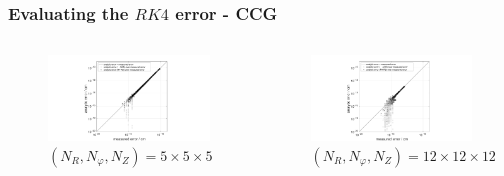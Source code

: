 \documentclass{beamer}
\begin{document}
\begin{frame}
\frametitle{Evaluating the $RK4$ error - CCG}
\vspace{-1.5cm}
\begin{columns}[onlytextwidth]
	\begin{column}{0.5\textwidth}
		\begin{center}
			\begin{figure}
				\includegraphics[trim={9cm 0cm 10cm 0cm},clip,width=1\textwidth]{FIGURES/RK4_alpha555_cyl.pdf}
				\caption{$(N_R,N_\varphi,N_Z)= 5\times5\times5$}

			\end{figure}
		\end{center}
	\end{column}
	\begin{column}{0.5\textwidth}
		\vspace{0cm}
		\begin{center}
					\begin{figure}
					\includegraphics[trim={9cm 0cm 10cm 0cm},clip,width=1\textwidth]{FIGURES/RK4_alpha121212_cyl.pdf}
				\caption{$(N_R,N_\varphi,N_Z)= 12\times12\times12$}
							\end{figure}
		\end{center}
	\end{column}
\end{columns}
\end{frame}
\end{document}
